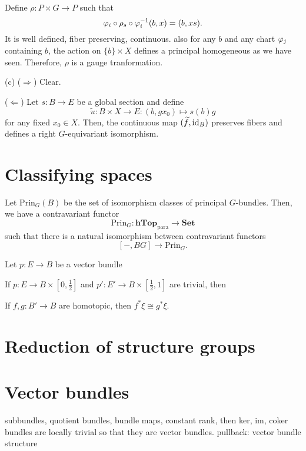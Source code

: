 \documentclass{../../large}
\begin{document}
\begin{pf}
Define $\rho:P\times G\to P$ such that
\[\varphi_i\circ\rho_s\circ\varphi_i^{-1}(b,x)=(b,xs).\]
It is well defined, fiber preserving, continuous.
also for any $b$ and any chart $\varphi_j$ containing $b$, the action on $\{b\}\times X$ defines a principal homogeneous as we have seen.
Therefore, $\rho$ is a gauge tranformation.

(c)
($\Rightarrow$)
Clear.

($\Leftarrow$)
Let $s:B\to E$ be a global section and define
\[\tilde u:B\times X\to E:(b,gx_0)\mapsto s(b)g\]
for any fixed $x_0\in X$.
Then, the continuous map $(\widetilde f,\operatorname{id}_B)$ preserves fibers and defines a right $G$-equivariant isomorphism.
\end{pf}

\begin{prb}

\end{prb}


\section{Classifying spaces}

Let $\mathrm{Prin}_G(B)$ be the set of isomorphism classes of principal $G$-bundles.
Then, we have a contravariant functor
\[\mathrm{Prin}_G:\mathbf{hTop}_{\mathrm{para}}\to\mathbf{Set}\]
such that there is a natural isomorphism between contravariant functors
\[[-,BG]\to\mathrm{Prin}_G.\]


\begin{prb}
Let $p:E\to B$ be a vector bundle
\begin{parts}
\item If $p:E\to B\times[0,\frac12]$ and $p':E'\to B\times[\frac12,1]$ are trivial, then 
\item If $f,g:B'\to B$ are homotopic, then $f^*\xi\cong g^*\xi$.
\end{parts}
\end{prb}

\begin{prb}

\end{prb}

\section{Reduction of structure groups}

\section{Vector bundles}
subbundles, quotient bundles, bundle maps,
constant rank, then ker, im, coker bundles are locally trivial so that they are vector bundles.
pullback: vector bundle structure
\end{document}
